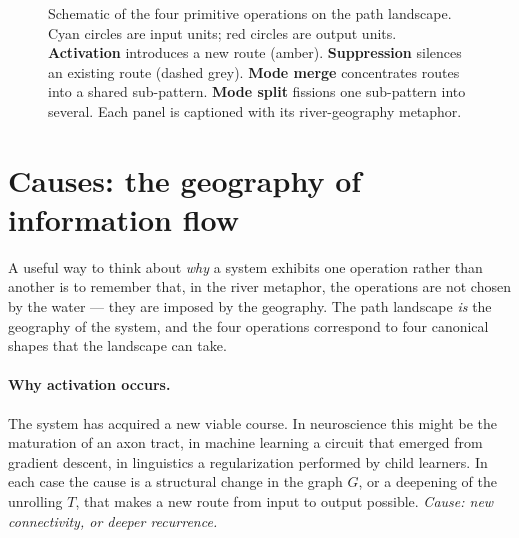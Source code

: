 \documentclass[11pt,a4paper]{article}
\begin{document}
\begin{figure}[h]
\caption{Schematic of the four primitive operations on the path
landscape. Cyan circles are input units; red circles are output
units. \textbf{Activation} introduces a new route (amber).
\textbf{Suppression} silences an existing route (dashed grey).
\textbf{Mode merge} concentrates routes into a shared sub-pattern.
\textbf{Mode split} fissions one sub-pattern into several. Each
panel is captioned with its river-geography metaphor.}
\label{fig:schematic}
\end{figure}

\section{Causes: the geography of information flow}

A useful way to think about \emph{why} a system exhibits one
operation rather than another is to remember that, in the river
metaphor, the operations are not chosen by the water --- they are
imposed by the geography. The path landscape \emph{is} the
geography of the system, and the four operations correspond to
four canonical shapes that the landscape can take.

\paragraph{Why activation occurs.} The system has acquired a new
viable course. In neuroscience this might be the maturation of an
axon tract, in machine learning a circuit that emerged from
gradient descent, in linguistics a regularization performed by
child learners. In each case the cause is a structural change in
the graph $G$, or a deepening of the unrolling $T$, that makes a
new route from input to output possible. \emph{Cause: new
connectivity, or deeper recurrence.}
\end{document}
